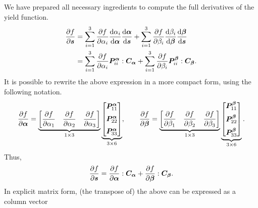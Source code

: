 We have prepared all necessary ingredients to compute the full derivatives of the yield function.
\begin{gather}
    \begin{split}
        \dfrac{\partial{f}}{\partial{\bm{s}}} & =\sum_{i=1}^{3}\dfrac{\partial{f}}{\partial{\alpha_i}}\dfrac{\mathrm{d}\alpha_i}{\mathrm{d}\bm{\alpha}}\dfrac{\mathrm{d}\bm{\alpha}}{\mathrm{d}\bm{s}}+\sum_{i=1}^{3}\dfrac{\partial{f}}{\partial{\beta_i}}\dfrac{\mathrm{d}\beta_i}{\mathrm{d}\bm{\beta}}\dfrac{\mathrm{d}\bm{\beta}}{\mathrm{d}\bm{s}} \\
                        & =\sum_{i=1}^{3}\dfrac{\partial{f}}{\partial{\alpha_i}}\bm{P}_{ii}^{\bm{\alpha}}:\bm{C}_{\bm{\alpha}}+\sum_{i=1}^{3}\dfrac{\partial{f}}{\partial{\beta_i}}\bm{P}_{ii}^{\bm{\beta}}:\bm{C}_{\bm{\beta}}.
    \end{split}
\end{gather}
It is possible to rewrite the above expression in a more compact form, using the following notation.
\begin{gather}
    \dfrac{\partial{f}}{\partial{\bm{\alpha}}}=\underbrace{\begin{bmatrix}
            \dfrac{\partial{f}}{\partial{\alpha_1}} & \dfrac{\partial{f}}{\partial{\alpha_2}} & \dfrac{\partial{f}}{\partial{\alpha_3}}
        \end{bmatrix}}_{1\times3}\underbrace{\begin{bmatrix}
            \bm{P}_{11}^{\bm{\alpha}} \\[2mm]\bm{P}_{22}^{\bm{\alpha}}\\[2mm]\bm{P}_{33}^{\bm{\alpha}}
        \end{bmatrix}}_{3\times6},\qquad
    \dfrac{\partial{f}}{\partial{\bm{\beta}}}=\underbrace{\begin{bmatrix}
            \dfrac{\partial{f}}{\partial{\beta_1}} & \dfrac{\partial{f}}{\partial{\beta_2}} & \dfrac{\partial{f}}{\partial{\beta_3}}
        \end{bmatrix}}_{1\times3}\underbrace{\begin{bmatrix}
            \bm{P}_{11}^{\bm{\beta}} \\[2mm]\bm{P}_{22}^{\bm{\beta}}\\[2mm]\bm{P}_{33}^{\bm{\beta}}
        \end{bmatrix}}_{3\times6}.
\end{gather}
Thus,
\begin{gather}
    \dfrac{\partial{f}}{\partial{\bm{s}}}=\dfrac{\partial{f}}{\partial{\bm{\alpha}}}:\bm{C}_{\bm{\alpha}}+\dfrac{\partial{f}}{\partial{\bm{\beta}}}:\bm{C}_{\bm{\beta}}.
\end{gather}
In explicit matrix form, (the transpose of) the above can be expressed as a column vector
